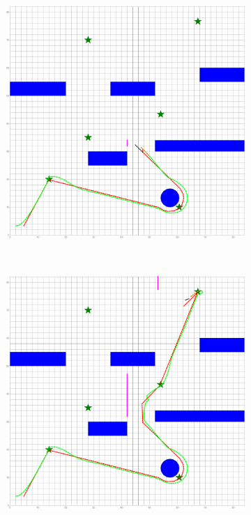 \documentclass[letterpaper, 10 pt, conference]{ieeeconf}
\begin{document}
\begin{figure}
\begin{subfigure}{0.2\textwidth}
			\includegraphics[width=\textwidth]{figures/sim_traj_obs1}
			\caption{}
			\label{fig:ref_traj_obs2}
		\end{subfigure}
		~
		\begin{subfigure}{0.2\textwidth}
			\includegraphics[width=\textwidth]{figures/sim_traj_obs2}

\end{subfigure}
\end{figure}
\end{document}
